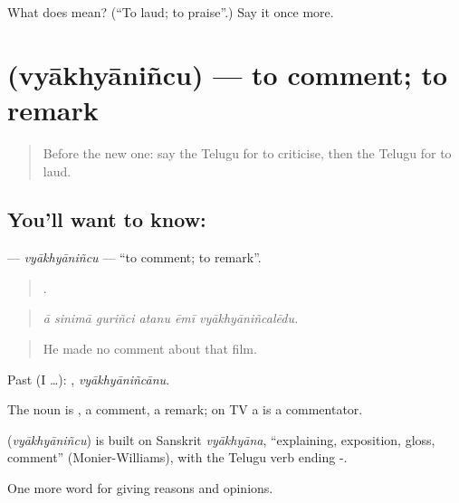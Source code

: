 \begin{tcolorbox}[breakable,colback=teal!4,colframe=teal!35!black,title={Before you move on}]
What does  mean? (\textquotedblleft{}To laud; to praise\textquotedblright{}.) Say it once more.
\end{tcolorbox}
\section[\texorpdfstring{\te{వ్యాఖ్యానించు} (vyākhyāniñcu)}{వ్యాఖ్యానించు (vyākhyāniñcu)}]{ (vyākhyāniñcu) — to comment; to remark}

\label{lesson:TE-C387-vyakhyanincu}



\begin{quote}
Before the new one: say the Telugu for to criticise, then the Telugu for to laud.
\end{quote}

\subsection*{You'll want to know: }
\textbf{} — \emph{vyākhyāniñcu} — \textquotedblleft{}to comment; to remark\textquotedblright{}.

\begin{quote}
     .
\end{quote}

\begin{quote}
\emph{ā sinimā guriñci atanu ēmī vyākhyāniñcalēdu.}
\end{quote}

\begin{quote}
He made no comment about that film.
\end{quote}

Past (I …): , \emph{vyākhyāniñcānu}.

The noun is , a comment, a remark; on TV a  is a commentator.

\begin{cousinweb}
\textbf{} (\emph{vyākhyāniñcu}) is built on Sanskrit \emph{vyākhyāna}, \textquotedblleft{}explaining, exposition, gloss, comment\textquotedblright{} (Monier-Williams), with the Telugu verb ending -.
\end{cousinweb}

\begin{grammarlens}[title={What you've built}]
One more word for giving reasons and opinions.
\end{grammarlens}


